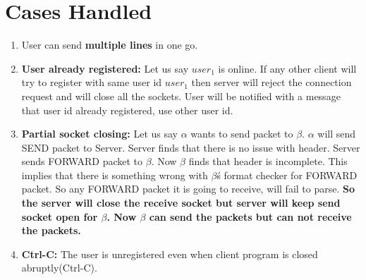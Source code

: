 \documentclass{article}
\begin{document}
\section{Cases Handled}
\begin{enumerate}
    \item User can send \textbf{multiple lines} in one go.
    \item \textbf{User already registered:} Let us say $user_{1}$ is online. If any other client will try to register with same user id $user_{1}$ then server will reject the connection request and will close all the sockets. User will be notified with a message that user id already registered, use other user id.
    \item \textbf{Partial socket closing:} Let us say $\alpha$ wants to send packet to $\beta$. $\alpha$ will send SEND packet to Server. Server finds that there is no issue with header. Server sends FORWARD packet to $\beta$. Now $\beta$ finds that header is incomplete. This implies that there is something wrong with $\beta$\'s format checker for FORWARD packet. So any FORWARD packet it is going to receive, will fail to parse. \textbf{So the server will close the receive socket but server will
    keep send socket open for $\beta$. Now $\beta$ can send the packets but can not receive the packets.}
    \item \textbf{Ctrl-C:} The user is unregistered even when client program is closed abruptly(Ctrl-C). 
\end{enumerate}{}
\end{document}
